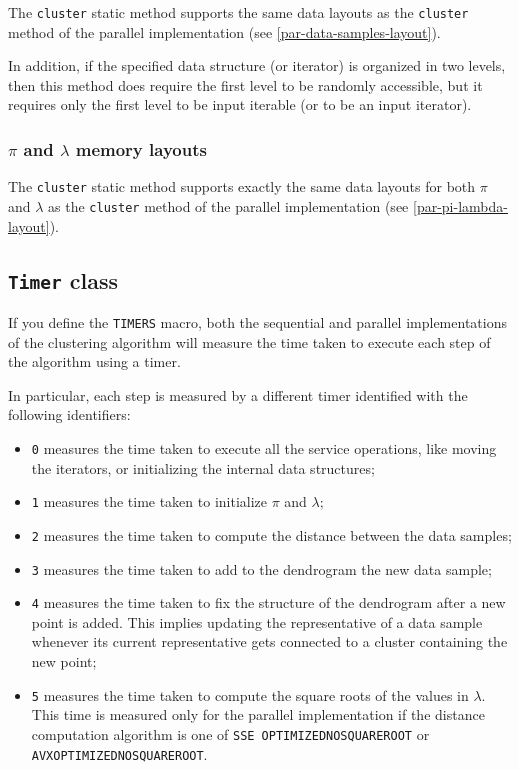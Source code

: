 \documentclass{article}
\begin{document}
The \texttt{cluster} static method supports the same data layouts as the \texttt{cluster} method
of the parallel implementation (see \ref{par-data-samples-layout}).

In addition, if the specified data structure (or iterator) is organized in two levels, then this
method does require the first level to be randomly accessible, but it requires only the first
level to be input iterable (or to be an input iterator).

\hypertarget{seq-pi-lambda-layout}{
\subsubsection{\boldmath$\pi$ and \boldmath$\lambda$  memory layouts}
\label{seq-pi-lambda-layout}}

The \texttt{cluster} static method supports exactly the same data layouts for both $\pi$
and $\lambda$ as the \texttt{cluster} method
of the parallel implementation (see \ref{par-pi-lambda-layout}).

\hypertarget{timers}{
\subsection{\texttt{Timer} class}
\label{timer}}

If you define the \texttt{TIMERS} macro, both the sequential and parallel implementations of the
clustering algorithm will measure the time taken to execute each step of the algorithm using a
timer.

In particular, each step is measured by a different timer identified with the following identifiers:
\begin{itemize}
\item \texttt{0} measures the time taken to execute all the service operations,
like moving the iterators, or initializing the internal data structures;
\item \texttt{1} measures the time taken to initialize $\pi$ and $\lambda$;
\item \texttt{2} measures the time taken to compute the distance between the data
samples;
\item \texttt{3} measures the time taken to add to the dendrogram the new data sample;
\item \texttt{4} measures the time taken to fix the structure of the dendrogram after
a new point is added. This implies updating the representative of a data sample whenever its
current representative gets connected to a cluster containing the new point;
\item \texttt{5} measures the time taken to compute the square roots of the values in
$\lambda$. This time is measured only for the parallel implementation if the distance
computation algorithm is one of \texttt{SSE\textunderscore
OPTIMIZED\textunderscore NO\textunderscore SQUARE\textunderscore ROOT} or\\
\texttt{AVX\textunderscore OPTIMIZED\textunderscore NO\textunderscore SQUARE\textunderscore ROOT}.
\end{itemize}
\end{document}
